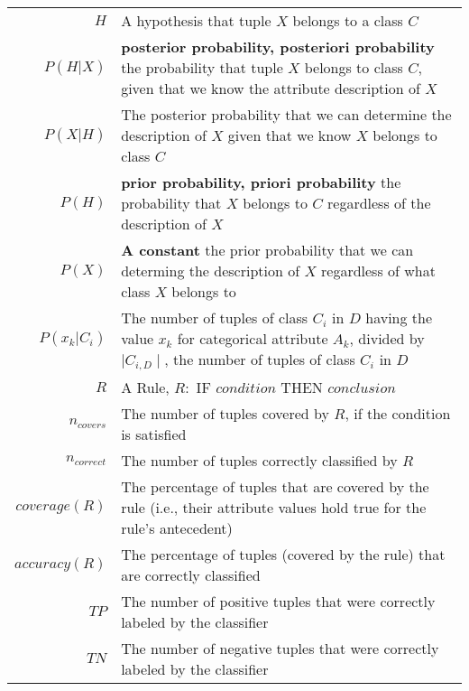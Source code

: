 \documentclass{article}
\begin{document}
\begin{longtable}{Rp{13cm}}
                $H$ & A hypothesis that tuple $X$ belongs to a class $C$\\

                $P(H|X)$ & \textbf{posterior probability, posteriori probability} the probability that tuple $X$ belongs to class $C$, given that we know the attribute description of $X$\\

                $P(X|H)$ & The posterior probability that we can determine the description of $X$ given that we know $X$ belongs to class $C$\\

                $P(H)$ & \textbf{prior probability, priori probability} the probability that $X$ belongs to $C$ regardless of the description of $X$\\

                $P(X)$ & \textbf{A constant} the prior probability that we can determing the description of $X$ regardless of what class $X$ belongs to\\

                $P(x_k|C_i)$ & The number of tuples of class $C_i$ in $D$ having the value $x_k$ for categorical attribute $A_k$, divided by $\mid C_{i,D} \mid$, the number of tuples of class $C_i$ in $D$\\

                $R$ & A Rule, $R:$ IF $condition$ THEN $conclusion$\\

                $n_{covers}$ & The number of tuples covered by $R$, if the condition is satisfied\\

                $n_{correct}$ & The number of tuples correctly classified by $R$\\

                $coverage(R)$ & The percentage of tuples that are covered by the rule (i.e., their attribute values hold true for the rule’s antecedent)\\

                $accuracy(R)$ & The percentage of tuples (covered by the rule) that are correctly classified\\

                 $TP$ & The number of positive tuples that were correctly labeled by the classifier\\

                 $TN$ & The number of negative tuples that were correctly labeled by the classifier\\


\end{longtable}
\end{document}
